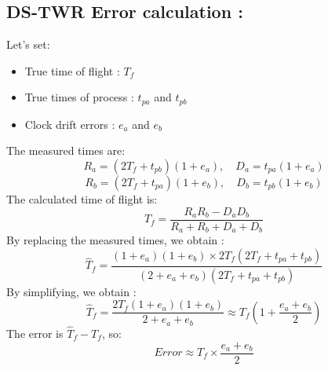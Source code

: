 \subsection*{DS-TWR Error calculation : } \label{DSTWR-Error-calculation}
Let's set: 
\begin{itemize}
\item True time of flight : $T_{f}$
\item True times of process : $t_{pa}$ and $t_{pb}$
\item Clock drift errors : $e_a$ and $e_b$
\end{itemize}
The measured times are: 
\begin{equation*}
R_a = (2T_f + t_{pb})(1 + e_a), \quad D_a = t_{pa}(1 + e_a)
\end{equation*}
\begin{equation*}
R_b = (2T_f + t_{pa})(1 + e_b), \quad D_b = t_{pb}(1 + e_b)
\end{equation*}
The calculated time of flight is:
\begin{equation*}
\hat{T}_f = \frac{R_a R_b - D_a D_b}{R_a + R_b + D_a + D_b}
\end{equation*}
By replacing the measured times, we obtain :
\begin{equation*}
\hat{T}_f = \frac{(1+e_a)(1+e_b) \times 2T_f(2T_f + t_{pa} + t_{pb})}{(2 + e_a + e_b)(2T_f + t_{pa} + t_{pb})}
\end{equation*}
By simplifying, we obtain :
\begin{equation*}
\hat{T}_f = \frac{2T_f(1+e_a)(1+e_b)}{2 + e_a + e_b} \approx T_f\left(1 + \frac{e_a + e_b}{2}\right)
\end{equation*}
The error is $\hat{T}_f - T_f$, so: \\
\begin{equation}
Error \approx  T_f \times \frac{e_a + e_b}{2} \label{error_DSTWR}
\end{equation}